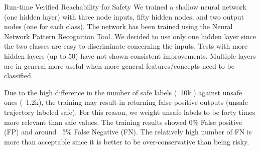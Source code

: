 \begin{section}{Run-time Verified Reachability for Safety}
We trained a shallow neural network (one hidden layer) with three node inputs, fifty hidden nodes, and two output nodes (one for each class).  
The network has been trained using the Neural Network Pattern Recognition Tool.
We decided to use only one hidden layer since the two classes are easy to discriminate concerning the inputs. Tests with more hidden layers (up to 50) have not shown consistent improvements. Multiple layers are in general more useful when more general features/concepts need to be classified.

Due to the high difference in the number of safe labels (~10k ) against unsafe ones (~1.2k), the training may result in returning false positive outputs (unsafe trajectory labeled safe). For this reason, we weight unsafe labels to be forty times more relevant than safe values. The training results showed 0\% False positive (FP) and around ~5\% False Negative (FN). The relatively high number of FN is more than acceptable since it is better to be over-conservative than being risky.
  

\end{section}
